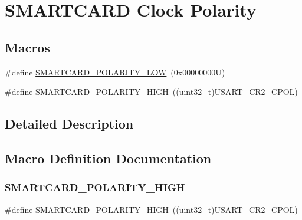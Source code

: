 \hypertarget{group___s_m_a_r_t_c_a_r_d___clock___polarity}{}\section{S\+M\+A\+R\+T\+C\+A\+RD Clock Polarity}
\label{group___s_m_a_r_t_c_a_r_d___clock___polarity}
\subsection*{Macros}
\begin{DoxyCompactItemize}
\item 
\#define \hyperlink{group___s_m_a_r_t_c_a_r_d___clock___polarity_ga07e246426d125fbc19f8e363f09b21e5}{S\+M\+A\+R\+T\+C\+A\+R\+D\+\_\+\+P\+O\+L\+A\+R\+I\+T\+Y\+\_\+\+L\+OW}~(0x00000000\+U)
\item 
\#define \hyperlink{group___s_m_a_r_t_c_a_r_d___clock___polarity_ga69e81ca7759a40f9e13c4051fe44a95f}{S\+M\+A\+R\+T\+C\+A\+R\+D\+\_\+\+P\+O\+L\+A\+R\+I\+T\+Y\+\_\+\+H\+I\+GH}~((uint32\+\_\+t)\hyperlink{group___peripheral___registers___bits___definition_gafbb4336ac93d94d4e78f9fb7b3a0dc68}{U\+S\+A\+R\+T\+\_\+\+C\+R2\+\_\+\+C\+P\+OL})
\end{DoxyCompactItemize}


\subsection{Detailed Description}


\subsection{Macro Definition Documentation}
\mbox{\label{group___s_m_a_r_t_c_a_r_d___clock___polarity_ga69e81ca7759a40f9e13c4051fe44a95f}} 
\subsubsection{\texorpdfstring{S\+M\+A\+R\+T\+C\+A\+R\+D\+\_\+\+P\+O\+L\+A\+R\+I\+T\+Y\+\_\+\+H\+I\+GH}{SMARTCARD\_POLARITY\_HIGH}}
{\footnotesize\ttfamily \#define S\+M\+A\+R\+T\+C\+A\+R\+D\+\_\+\+P\+O\+L\+A\+R\+I\+T\+Y\+\_\+\+H\+I\+GH~((uint32\+\_\+t)\hyperlink{group___peripheral___registers___bits___definition_gafbb4336ac93d94d4e78f9fb7b3a0dc68}{U\+S\+A\+R\+T\+\_\+\+C\+R2\+\_\+\+C\+P\+OL})}

